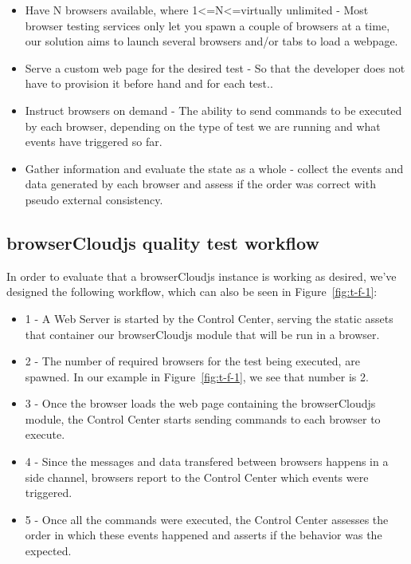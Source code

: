 \begin{itemize}
    \item Have N browsers available, where 1\textless=N\textless=virtually unlimited - Most browser testing services only let you spawn a couple of browsers at a time, our solution aims to launch several browsers and/or tabs to load a webpage.
    \item Serve a custom web page for the desired test - So that the developer does not have to provision it before hand and for each test..
    \item Instruct browsers on demand - The ability to send commands to be executed by each browser, depending on the type of test we are running and what events have triggered so far.
    \item Gather information and evaluate the state as a whole - collect the events and data generated by each browser and assess if the order was correct with pseudo external consistency.
\end{itemize}

\subsection{browserCloudjs quality test workflow}

In order to evaluate that a browserCloudjs instance is working as desired, we've designed the following workflow, which can also be seen in Figure~\ref{fig:t-f-1}:

\begin{itemize}
    \item 1 - A Web Server is started by the Control Center, serving the static assets that container our browserCloudjs module that will be run in a browser.
    \item 2 - The number of required browsers for the test being executed, are spawned. In our example in Figure~\ref{fig:t-f-1}, we see that number is 2.  
    \item 3 - Once the browser loads the web page containing the browserCloudjs module, the Control Center starts sending commands to each browser to execute.
    \item 4 - Since the messages and data transfered between browsers happens in a side channel, browsers report to the Control Center which events were triggered.
    \item 5 - Once all the commands were executed, the Control Center assesses the order in which these events happened and asserts if the behavior was the expected.
\end{itemize}

